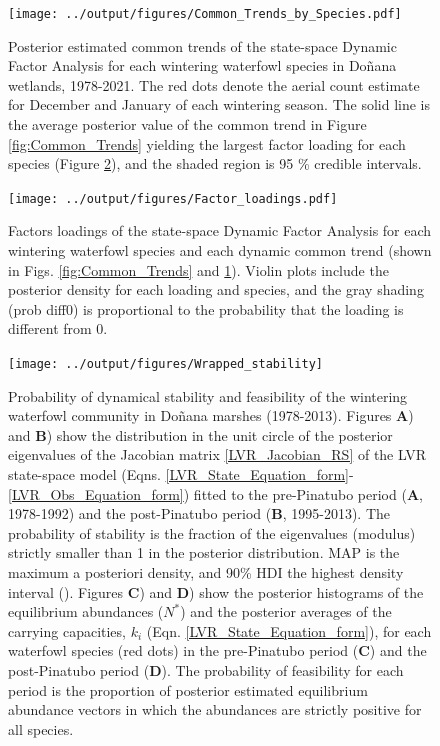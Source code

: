 \documentclass[12pt]{article}
\begin{document}
	\begin{figure}[t]
		\centering
		\texttt{[image: ../output/figures/Common\_Trends\_by\_Species.pdf]}
		\caption[Posterior estimated common trends of the state-space DFA]{Posterior estimated common trends of the state-space Dynamic Factor Analysis for each wintering waterfowl species in Doñana wetlands, 1978-2021. The red dots denote the aerial count estimate for December and January of each wintering season. The solid line is the average posterior value of the common trend in Figure \ref{fig:Common_Trends} yielding the largest factor loading for each species (Figure \ref{fig:Factor_loadings}), and the shaded region is 95 \% credible intervals.}
		\label{fig:Common_Trends_by_Species}
	\end{figure}

	\begin{figure}[t]
		\centering
		\texttt{[image: ../output/figures/Factor\_loadings.pdf]}
		\caption[Factors loadings of the state-space DFA]{Factors loadings of the state-space Dynamic Factor Analysis for each wintering waterfowl species and each dynamic common trend (shown in Figs. \ref{fig:Common_Trends} and \ref{fig:Common_Trends_by_Species}). Violin plots include the posterior density for each loading and species, and the gray shading (prob diff0) is proportional to the probability that the loading is different from 0.}
		\label{fig:Factor_loadings}
	\end{figure}

	\begin{figure}[t]
		\centering
		\texttt{[image: ../output/figures/Wrapped\_stability]}
		\caption[Posterior distribution of dynamical stability and feasibility in alternative stable states]{Probability of dynamical stability and feasibility of the wintering waterfowl community in Doñana marshes (1978-2013). Figures \textbf{A}) and \textbf{B}) show the distribution in the unit circle of the posterior eigenvalues of the Jacobian matrix \ref{LVR_Jacobian_RS} of the LVR state-space model (Eqns. \ref{LVR_State_Equation_form}-\ref{LVR_Obs_Equation_form}) fitted to the pre-Pinatubo period (\textbf{A}, 1978-1992) and the post-Pinatubo period (\textbf{B}, 1995-2013). The probability of stability is the fraction of the eigenvalues (modulus) strictly smaller than 1 in the posterior distribution. MAP is the maximum a posteriori density, and 90\% HDI the highest density interval (\cite{Makowski2019}). Figures \textbf{C}) and \textbf{D}) show the posterior histograms of the equilibrium abundances ($N^*$) and the posterior averages of the carrying capacities, $k_{i}$ (Eqn. \ref{LVR_State_Equation_form}), for each waterfowl species (red dots) in the pre-Pinatubo period (\textbf{C}) and the post-Pinatubo period (\textbf{D}). The probability of feasibility for each period is the proportion of posterior estimated equilibrium abundance vectors in which the abundances are strictly positive for all species.}
		\label{fig:Wrapped_stability}
	\end{figure}
\end{document}
